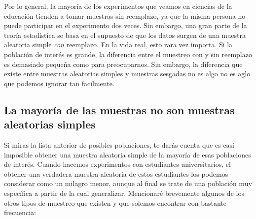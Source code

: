 \documentclass[spanish,]{book}
\begin{document}
Por lo general, la mayoría de los experimentos que veamos en ciencias de
la educación tienden a tomar muestras sin reemplazo, ya que la misma
persona no puede participar en el experimento dos veces. Sin embargo,
una gran parte de la teoría estadística se basa en el supuesto de que
los datos surgen de una muestra aleatoria simple \emph{con} reemplazo.
En la vida real, esto rara vez importa. Si la población de interés es
grande, la diferencia entre el muestreo con y sin reemplazo es demasiado
pequeña como para preocuparnos. Sin embargo, la diferencia que existe
entre muestras aleatorias simples y muestras sesgadas no es algo no es
aglo que podemos ignorar tan facilmente.

\subsection{La mayoría de las muestras no son muestras aleatorias
simples}\label{la-mayoria-de-las-muestras-no-son-muestras-aleatorias-simples}

Si miras la lista anterior de posibles poblaciones, te darás cuenta que
es casi imposible obtener una muestra aleatoria simple de la mayoría de
esas poblaciones de interés. Cuando hacemos experimentos con estudiantes
universitarios, el obtener una verdadera muestra aleatoria de estos
estudiantes los podemos considerar como un milagro menor, aunque al
final se trate de una población muy específica a partir de la cual
generalizar. Mencionaré brevemente algunos de los otros tipos de
muestreo que existen y que solemos encontrar con bastante frecuencia:
\end{document}
